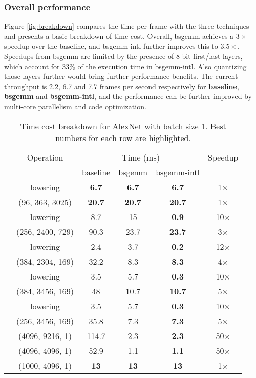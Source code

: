 \documentclass[sigconf]{acmart}
\begin{document}
\subsubsection{Overall performance}
Figure \ref{fig:breakdown} compares the time per frame with the three techniques and presents a basic breakdown of time cost.
Overall, bsgemm achieves a $3\times$ speedup over the baseline, and bsgemm-intl further improves this to $3.5\times$.
Speedups from bsgemm are limited by the presence of 8-bit first/last layers, which account for 33\% of the execution time in bsgemm-intl.
Also quantizing those layers further would bring further performance benefits.
The current throughput is 2.2, 6.7 and 7.7 frames per second respectively for \textbf{baseline}, \textbf{bsgemm} and \textbf{bsgemm-intl}, and the performance can be further improved by multi-core parallelism and code optimization.

\begin{table}
	\centering
	\caption{Time cost breakdown for  AlexNet with batch size 1. Best numbers for each row are highlighted.}
	\label{tab:detailedbreakdown}
	\footnotesize
	\begin{tabular}{@{}cccccc@{}}
		\toprule
&		Operation & \multicolumn{3}{c}{Time (ms)} & Speedup \\
		\cmidrule(r){3-5}
&		   & baseline       & bsgemm          & bsgemm-intl             &          \\
		\midrule
		\parbox[t]{2mm}{} &
		lowering & \textbf{6.7} & \textbf{6.7} & \textbf{6.7} & 1$\times$ \\
&		(96, 363, 3025) & \textbf{20.7} & \textbf{20.7} & \textbf{20.7} & 1$\times$ \\
&		lowering & 8.7 & 15 & \textbf{0.9} & 10$\times$ \\
&		(256, 2400, 729) & 90.3 & 23.7 & \textbf{23.7} & 3$\times$ \\
&		lowering & 2.4 & 3.7 & \textbf{0.2} & 12$\times$ \\
&		(384, 2304, 169) & 32.2 & 8.3 & \textbf{8.3} & 4$\times$ \\
&		lowering & 3.5 & 5.7 & \textbf{0.3} & 10$\times$ \\
&		(384, 3456, 169) & 48 & 10.7 & \textbf{10.7} & 5$\times$ \\
&		lowering & 3.5 & 5.7 & \textbf{0.3} & 10$\times$ \\
&		(256, 3456, 169) & 35.8 & 7.3 & \textbf{7.3} & 5$\times$ \\
		\midrule
		\parbox[t]{2mm}{}
&		(4096, 9216, 1)  & 114.7 & 2.3 & \textbf{2.3} & 50$\times$ \\
&		(4096, 4096, 1)  & 52.9 & 1.1 & \textbf{1.1} & 50$\times$ \\
&		(1000, 4096, 1)  & \textbf{13} & \textbf{13} & \textbf{13} & 1$\times$	\\
		\bottomrule

	\end{tabular}
\end{table}
\end{document}
